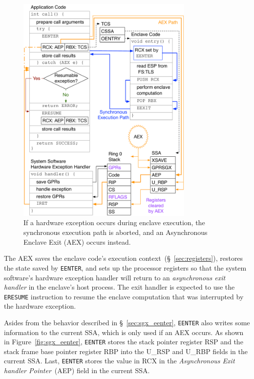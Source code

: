 \begin{figure}[hbt]
  \centering
  \includegraphics[width=87mm]{figures/sgx_aex_setup.pdf}
  \caption{
    If a hardware exception occurs during enclave execution, the synchronous
    execution path is aborted, and an Asynchronous Enclave Exit (AEX) occurs
    instead.
  }
  \label{fig:sgx_aex_setup}
\end{figure}


The AEX saves the enclave code's execution context~(\S~\ref{sec:registers}),
restores the state saved by \texttt{EENTER}, and sets up the processor
registers so that the system software's hardware exception handler will return
to an \textit{asynchronous exit handler} in the enclave's host process. The
exit handler is expected to use the \texttt{ERESUME} instruction to resume the
enclave computation that was interrupted by the hardware exception.

Asides from the behavior described in \S~\ref{sec:sgx_eenter}, \texttt{EENTER}
also writes some information to the current SSA, which is only used if an AEX
occurs. As shown in Figure~\ref{fig:sgx_eenter}, \texttt{EENTER} stores the
stack pointer register RSP and the stack frame base pointer register RBP into
the U\_RSP and U\_RBP fields in the current SSA. Last, \texttt{EENTER} stores
the value in RCX in the \textit{Asynchronous Exit handler Pointer}~(AEP) field
in the current SSA.

